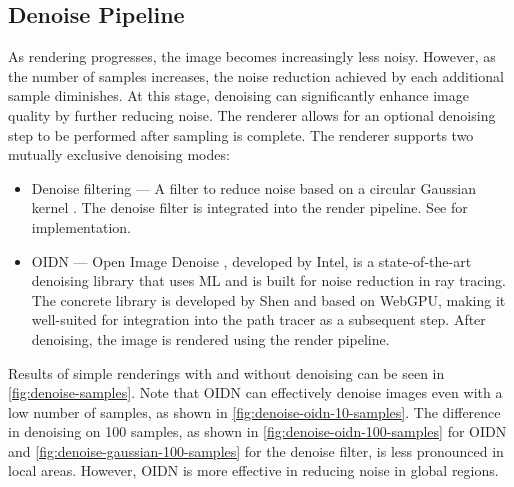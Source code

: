 \subsection*{Denoise Pipeline}

As rendering progresses, the image becomes increasingly less noisy. However, as the number of samples increases, the noise reduction achieved by each additional sample diminishes. At this stage, denoising can significantly enhance image quality by further reducing noise. The renderer allows for an optional denoising step to be performed after sampling is complete. The renderer supports two mutually exclusive denoising modes:

\begin{itemize}
  \item{Denoise filtering} — A filter to reduce noise based on a circular Gaussian kernel \cite{conventionalGaussianDenoise}. The denoise filter is integrated into the render pipeline. See  for implementation.
  \item{\gls{OIDN}} — Open Image Denoise \cite{openImageDenoise}, developed by Intel, is a state-of-the-art denoising library that uses \gls{ML} and is built for noise reduction in ray tracing. The concrete library is developed by Shen \cite{oidnWeb} and based on \gls{WebGPU}, making it well-suited for integration into the path tracer as a subsequent step. After denoising, the image is rendered using the render pipeline.
\end{itemize}

Results of simple renderings with and without denoising can be seen in \autoref{fig:denoise-samples}. Note that \gls{OIDN} can effectively denoise images even with a low number of samples, as shown in \autoref{fig:denoise-oidn-10-samples}. The difference in denoising on 100 samples, as shown in \autoref{fig:denoise-oidn-100-samples} for \gls{OIDN} and \autoref{fig:denoise-gaussian-100-samples} for the denoise filter, is less pronounced in local areas. However, \gls{OIDN} is more effective in reducing noise in global regions.

